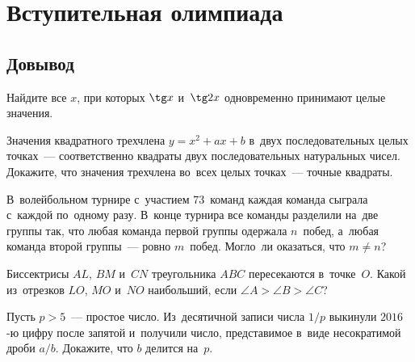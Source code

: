 
\section*{Вступительная олимпиада}


\subsection*{Довывод}

\begin{problems}

\item
Найдите все $x$, при которых $\tg x$ и~$\tg 2x$ одновременно принимают целые
значения.

\item
Значения квадратного трехчлена $y = x^2 + ax + b$ в~двух последовательных целых
точках~--- соответственно квадраты двух последовательных натуральных чисел.
Докажите, что значения трехчлена во~всех целых точках~--- точные квадраты.

\item
В~волейбольном турнире с~участием $73$~команд каждая команда сыграла с~каждой
по~одному разу.
В~конце турнира все команды разделили на~две группы так, что любая команда
первой группы одержала $n$~побед, а~любая команда второй группы~--- ровно
$m$~побед.
Могло~ли оказаться, что $m \neq n$?

\item
Биссектрисы $AL$, $BM$ и~$CN$ треугольника $ABC$ пересекаются в~точке~$O$.
Какой из~отрезков $LO$, $MO$ и~$NO$ наибольший, если
$\angle A > \angle B > \angle C$?

\item
Пусть $p > 5$~--- простое число.
Из~десятичной записи числа $1 / p$ выкинули $2016$-ю цифру после запятой
и~получили число, представимое в~виде несократимой дроби $a / b$.
Докажите, что $b$ делится на~$p$.

\end{problems}


